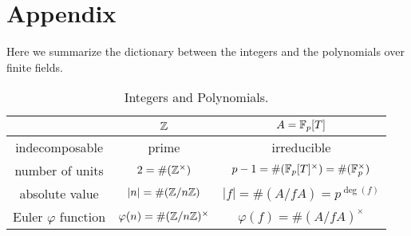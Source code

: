\section*{Appendix}

Here we summarize the dictionary between the integers and the polynomials over finite fields.

\begin{table}[h]
    \begin{center}
        \begin{tabular}{c|c|c}
            \toprule
            & $\mathbb{Z}$ & $A = \mathbb{F}_p[T]$ \\
            \midrule
            indecomposable & prime & irreducible \\
            number of units &$2 = \#(\mathbb{Z}^\times)$ & $p - 1 = \# (\mathbb{F}_p[T]^\times) = \# (\mathbb{F}_p^\times)$ \\
            absolute value & $|n| = \# (\mathbb{Z} / n\mathbb{Z})$ & $|f| = \# (A / f A) = p^{\deg (f)}$ \\
            Euler $\varphi$ function & $\varphi(n) = \# (\mathbb{Z} / n \mathbb{Z})^\times$ & $\varphi(f) = \# (A / fA)^\times$ \\
            \bottomrule
        \end{tabular}
        \caption{Integers and Polynomials.}
        \label{tab:dictionary}
    \end{center}
\end{table}
